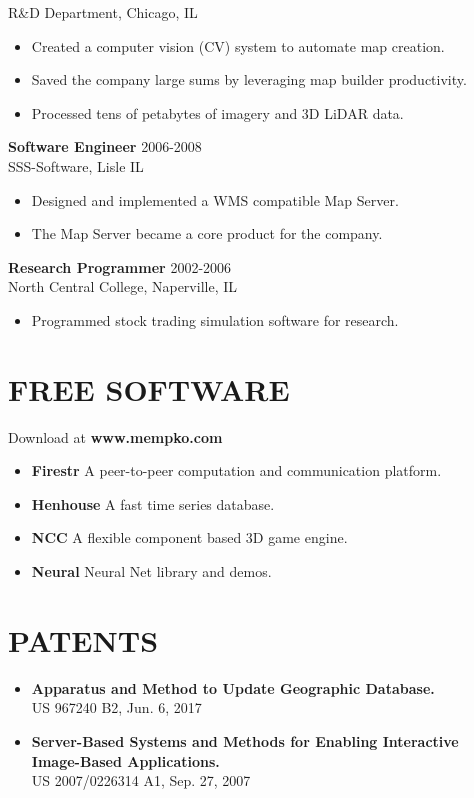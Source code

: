 \documentclass[line,margin]{res}
\begin{document}
\begin{resume}
                R\&D Department, Chicago, IL
                 \begin{itemize}  \itemsep -2pt %
                         \item Created a computer vision (CV)
                        system to automate map creation.
                    \item Saved the company large sums by leveraging map builder productivity.
                    \item Processed tens of petabytes of imagery and 3D LiDAR data.
                \end{itemize}
                {\bf Software Engineer} \hfill  2006-2008 \\
                SSS-Software, Lisle IL
                 \begin{itemize}  \itemsep -2pt 
                    \item Designed and implemented a WMS compatible Map Server.
                    \item The Map Server became a core product for the company.
                 \end{itemize} 
                {\bf Research Programmer} \hfill 2002-2006 \\
                North Central College, Naperville, IL
                \begin{itemize} \itemsep -2pt 
                    \item Programmed stock trading simulation software for research.
                \end{itemize} 
\section{FREE SOFTWARE} Download at {\bf www.mempko.com} \\ 
                \begin{itemize} \itemsep -2pt 
                    \item {\bf Firestr} A peer-to-peer computation and communication platform.
                    \item {\bf Henhouse} A fast time series database.
                    \item {\bf NCC} A flexible component based 3D game engine.
                    \item {\bf Neural} Neural Net library and demos.
                \end{itemize}
\section{PATENTS} 
            \begin{itemize} \itemsep -2pt 
                    \item {\bf Apparatus and Method to Update Geographic Database.} \\ US 967240 B2, Jun. 6, 2017
                    \item {\bf Server-Based Systems and Methods for Enabling Interactive Image-Based Applications.} \\ US 2007/0226314 A1, Sep. 27, 2007
            \end{itemize}

\end{resume}
\end{document}
